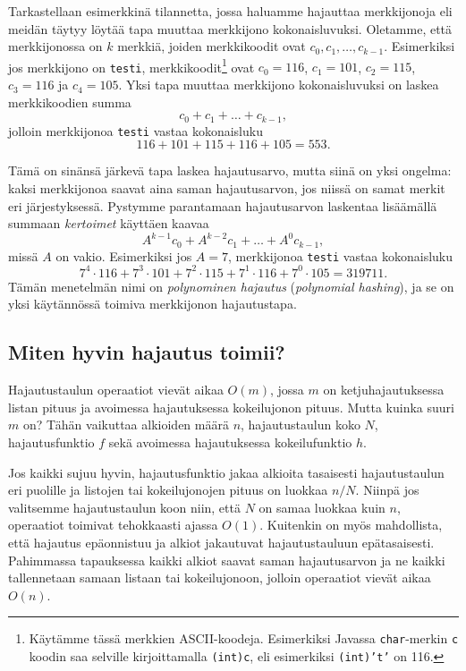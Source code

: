 Tarkastellaan esimerkkinä tilannetta, jossa haluamme hajauttaa merkkijonoja
eli mei\-dän täytyy löytää tapa muuttaa merkkijono kokonaisluvuksi.
Oletamme, että merkkijonossa on $k$ merkkiä,
joiden merkkikoodit ovat $c_0,c_1,\dots,c_{k-1}$.
Esimerkiksi jos merkkijono on \texttt{testi},
merkkikoodit\footnote{Käytämme tässä merkkien ASCII-koodeja.
Esimerkiksi Javassa \texttt{char}-merkin \texttt{c} koodin saa
selville kirjoittamalla \texttt{(int)c}, eli esimerkiksi
\texttt{(int)'t'} on 116.} ovat $c_0=116$, $c_1=101$, $c_2=115$,
$c_3=116$ ja $c_4=105$.
Yksi tapa muuttaa merkkijono kokonaisluvuksi
on laskea merkkikoodien summa
\[ c_0 + c_1 + \dots + c_{k-1},\]
jolloin merkkijonoa \texttt{testi} vastaa kokonaisluku
\[116+101+115+116+105=553.\]


Tämä on sinänsä järkevä tapa laskea hajautusarvo, mutta siinä on yksi ongelma:
kaksi merkkijonoa saavat aina saman hajautusarvon,
jos niissä on samat merkit eri järjestyksessä.
Pystymme parantamaan hajautusarvon laskentaa lisäämällä
summaan \emph{kertoimet} käyttäen kaavaa
\[ A^{k-1} c_0 + A^{k-2} c_1 + \dots + A^0 c_{k-1},\]
missä $A$ on vakio.
Esimerkiksi jos $A=7$, merkkijonoa \texttt{testi} vastaa kokonaisluku
\[7^4 \cdot 116+7^3 \cdot 101+7^2 \cdot 115+7^1 \cdot 116+7^0 \cdot 105=319711.\]
Tämän menetelmän nimi on \emph{polynominen hajautus}
(\emph{polynomial hashing}),
ja se on yksi käytännössä toimiva merkkijonon hajautustapa.

\subsection{Miten hyvin hajautus toimii?}

Hajautustaulun operaatiot vievät aikaa $O(m)$,
jossa $m$ on ketjuhajautuksessa listan pituus
ja avoimessa hajautuksessa kokeilujonon pituus.
Mutta kuinka suuri $m$ on? Tähän vaikuttaa
alkioiden määrä $n$, hajautustaulun koko $N$,
hajautusfunktio $f$ sekä avoimessa hajautuksessa
kokeilufunktio $h$.

Jos kaikki sujuu hyvin, hajautusfunktio jakaa alkioita
tasaisesti hajautustaulun eri puolille
ja listojen tai kokeilujonojen pituus on luokkaa $n/N$.
Niinpä jos valitsemme hajautustaulun koon niin,
että $N$ on samaa luokkaa kuin $n$,
operaatiot toimivat tehokkaasti ajassa $O(1)$.
Kuitenkin on myös mahdollista, että hajautus epäonnistuu
ja alkiot jakautuvat hajautustauluun epätasaisesti.
Pahimmassa tapauksessa kaikki alkiot saavat saman
hajautusarvon ja ne kaikki tallennetaan samaan listaan
tai kokeilujonoon, jolloin operaatiot vievät aikaa $O(n)$.

